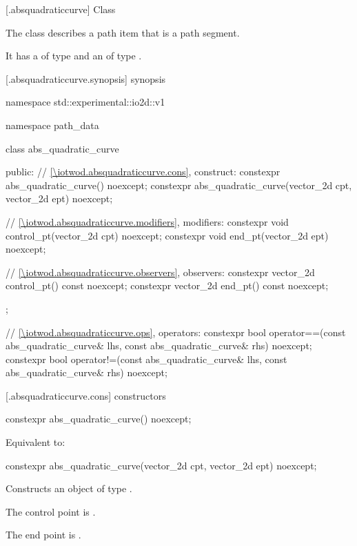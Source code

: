  [\iotwod.absquadraticcurve] {Class }

\pnum
{}%
The class  describes a path item that is a path segment.

\pnum
It has a  of type  and an  of type .

 [\iotwod.absquadraticcurve.synopsis] { synopsis}

\begin{codeblock}
namespace std::experimental::io2d::v1 {
  namespace path_data {
    class abs_quadratic_curve {
    public:
      // \ref{\iotwod.absquadraticcurve.cons}, construct:
      constexpr abs_quadratic_curve() noexcept;
      constexpr abs_quadratic_curve(vector_2d cpt, vector_2d ept)
        noexcept;

      // \ref{\iotwod.absquadraticcurve.modifiers}, modifiers:
      constexpr void control_pt(vector_2d cpt) noexcept;
      constexpr void end_pt(vector_2d ept) noexcept;

      // \ref{\iotwod.absquadraticcurve.observers}, observers:
      constexpr vector_2d control_pt() const noexcept;
      constexpr vector_2d end_pt() const noexcept;
    };
    
    // \ref{\iotwod.absquadraticcurve.ops}, operators:
    constexpr bool operator==(const abs_quadratic_curve& lhs,
      const abs_quadratic_curve& rhs) noexcept;
    constexpr bool operator!=(const abs_quadratic_curve& lhs,
      const abs_quadratic_curve& rhs) noexcept;
  }
}
\end{codeblock}

 [\iotwod.absquadraticcurve.cons] { constructors}

%
\begin{itemdecl}
constexpr abs_quadratic_curve() noexcept;
\end{itemdecl}
\begin{itemdescr}
\pnum
\effects
Equivalent to: 
\end{itemdescr}

%
\begin{itemdecl}
constexpr abs_quadratic_curve(vector_2d cpt, vector_2d ept)
  noexcept;
\end{itemdecl}
\begin{itemdescr}
\pnum
\effects
Constructs an object of type .

\pnum
The control point is .

\pnum
The end point is .
\end{itemdescr}

